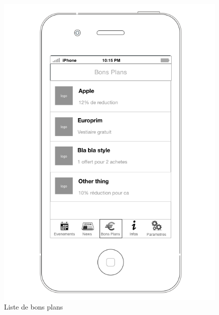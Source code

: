 \documentclass[a4paper, 11px]{article}
\begin{document}
\begin{figure}[htbp]
	\begin{minipage}[c]{.50\linewidth}
		\begin{center}
			\includegraphics[scale=0.29]{../../Sketch/iOS/bons_plans_liste.png}
		\end{center}
	\caption{Liste de bons plans}


\end{minipage}
\end{figure}
\end{document}

